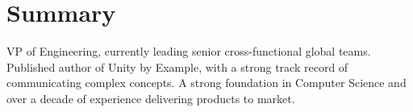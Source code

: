 \section{Summary}

VP of Engineering, currently leading senior cross-functional global teams. Published author of Unity by Example, with a strong track record of communicating complex concepts. A strong foundation in Computer Science and over a decade of experience delivering products to market.